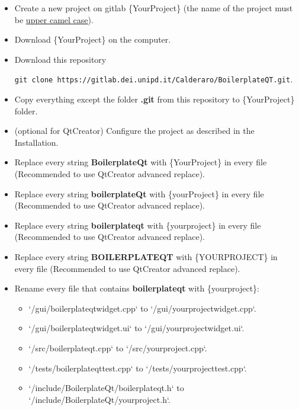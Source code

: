 \begin{itemize}
      \tightlist
      \item
            Create a new project on gitlab \{YourProject\} (the name of the
            project must be \href{https://en.wikipedia.org/wiki/Camel_case}{upper
                  camel case}).
      \item
            Download \{YourProject\} on the computer.
      \item
            Download this repository

            \texttt{git\ clone\ https://gitlab.dei.unipd.it/Calderaro/BoilerplateQT.git}.
      \item
            Copy everything except the folder \textbf{.git} from this repository
            to \{YourProject\} folder.
      \item
            (optional for QtCreator) Configure the project as described in the
            Installation.
      \item
            Replace every string \textbf{BoilerplateQt} with \{YourProject\} in
            every file (Recommended to use QtCreator advanced replace).
      \item
            Replace every string \textbf{boilerplateQt} with \{yourProject\} in
            every file (Recommended to use QtCreator advanced replace).
      \item
            Replace every string \textbf{boilerplateqt} with \{yourproject\} in
            every file (Recommended to use QtCreator advanced replace).
      \item
            Replace every string \textbf{BOILERPLATEQT} with \{YOURPROJECT\} in
            every file (Recommended to use QtCreator advanced replace).
      \item
            Rename every file that contains \textbf{boilerplateqt} with
            \{yourproject\}:
            \begin{itemize}
                  \tightlist
                  \item
                        `/gui/boilerplateqtwidget.cpp` to `/gui/{yourproject}widget.cpp`.

                  \item
                        `/gui/boilerplateqtwidget.ui` to `/gui/{yourproject}widget.ui`.

                  \item
                        `/src/boilerplateqt.cpp` to `/src/{yourproject}.cpp`.

                  \item
                        `/tests/boilerplateqttest.cpp` to `/tests/{yourproject}test.cpp`.

                  \item
                        `/include/BoilerplateQt/boilerplateqt.h` to `/include/BoilerplateQt/{yourproject}.h`.
            \end{itemize}
\end{itemize}


